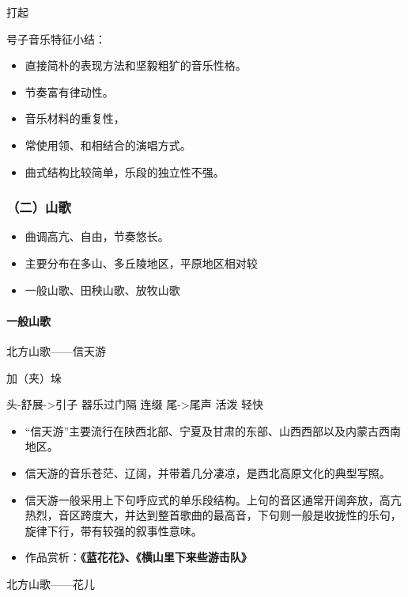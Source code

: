 \documentclass[
]{article}
\providecommand{\tightlist}{%
  \setlength{\itemsep}{0pt}\setlength{\parskip}{0pt}}
\begin{document}
打起

号子音乐特征小结：

\begin{itemize}
\tightlist
\item
  直接简朴的表现方法和坚毅粗犷的音乐性格。
\item
  节奏富有律动性。
\item
  音乐材料的重复性，
\item
  常使用领、和相结合的演唱方式。
\item
  曲式结构比较简单，乐段的独立性不强。
\end{itemize}

\subsubsection{（二）山歌}\label{ux4e8cux5c71ux6b4c}

\begin{itemize}
\tightlist
\item
  曲调高亢、自由，节奏悠长。
\item
  主要分布在多山、多丘陵地区，平原地区相对较
\item
  一般山歌、田秧山歌、放牧山歌
\end{itemize}

\paragraph{一般山歌}\label{ux4e00ux822cux5c71ux6b4c}

北方山歌------信天游

加（夹）垛

头-舒展-\textgreater 引子 器乐过门隔 连缀 尾-\textgreater 尾声 活泼 轻快

\begin{itemize}
\tightlist
\item
  ``信天游''主要流行在陕西北部、宁夏及甘肃的东部、山西西部以及内蒙古西南地区。
\item
  信天游的音乐苍茫、辽阔，并带着几分凄凉，是西北高原文化的典型写照。
\item
  信天游一般采用上下句呼应式的单乐段结构。上句的音区通常开阔奔放，高亢热烈，音区跨度大，并达到整首歌曲的最高音，下句则一般是收拢性的乐句，旋律下行，带有较强的叙事性意味。
\item
  作品赏析：\textbf{《蓝花花》、《横山里下来些游击队》}
\end{itemize}

北方山歌------花儿
\end{document}
